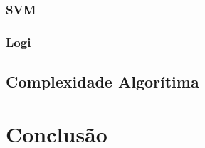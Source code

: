 \subsection{SVM}




\subsection{\jqo}



\subsection{Logi}





% 
% 
% 
% 
% 
% 
% 
% 
% 
% 
% 
% 
% 
% 


\section{Complexidade Algorítima}




\chapter{Conclusão}
\label{sec:conclusions}

